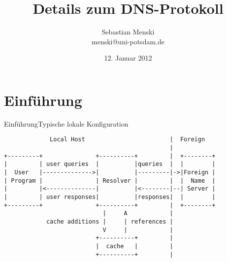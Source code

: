 \documentclass{beamer}
\title{Details zum DNS-Protokoll}
\author{Sebastian Menski\\menski@uni-potsdam.de}
\institute{Institut für Informatik\\Universität Potsdam}
\date{12. Januar 2012}
\begin{document}
  \frame{\thispagestyle{empty}\titlepage}

  \newcommand{\mytitle}{}

  \newcommand{\mysection}[1]{
    \renewcommand{\mytitle}{#1}
    \section{#1}
    \frame{\thispagestyle{empty}
      \begin{center}
        \textcolor{beamer@blendedblue}{\LARGE\mytitle}
      \end{center}
    }
  }

  \newcommand{\myframe}[2][\empty]{
    \frame{\frametitle{\mytitle}
      \ifthenelse{\equal{#1}{\empty}}
      {#2}
      {\framesubtitle{#1}#2}
    }
  }

  \newcommand{\mybreakframe}[2][\empty]{
    \frame[allowframebreaks]{\frametitle{\mytitle}
      \ifthenelse{\equal{#1}{\empty}}
      {#2}
      {\framesubtitle{#1}#2}
    }
  }


  \mysection{Einführung}

  \begin{frame}[fragile]{\mytitle{}}{Typische lokale Konfiguration}
\footnotesize{
      \begin{verbatim}
             Local Host                        |  Foreign
                                               |
+---------+               +----------+         |  +--------+
|         | user queries  |          |queries  |  |        |
|  User   |-------------->|          |---------|->|Foreign |
| Program |               | Resolver |         |  |  Name  |
|         |<--------------|          |<--------|--| Server |
|         | user responses|          |responses|  |        |
+---------+               +----------+         |  +--------+
                            |     A            |
            cache additions |     | references |
                            V     |            |
                          +----------+         |
                          |  cache   |         |
                          +----------+         |
  \end{verbatim}}
\end{frame}
\end{document}
